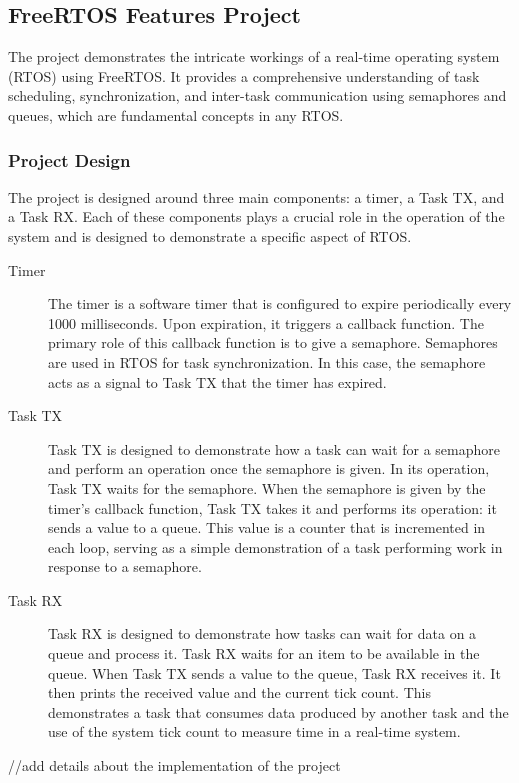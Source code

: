\subsection{FreeRTOS Features Project}

The project demonstrates the intricate workings of a real-time operating system (RTOS) using FreeRTOS. It provides a comprehensive understanding of task scheduling, synchronization, and inter-task communication using semaphores and queues, which are fundamental concepts in any RTOS.

\subsubsection{Project Design}

The project is designed around three main components: a timer, a Task TX, and a Task RX. Each of these components plays a crucial role in the operation of the system and is designed to demonstrate a specific aspect of RTOS.

\begin{description}
\item[Timer] The timer is a software timer that is configured to expire periodically every 1000 milliseconds. Upon expiration, it triggers a callback function. The primary role of this callback function is to give a semaphore. Semaphores are used in RTOS for task synchronization. In this case, the semaphore acts as a signal to Task TX that the timer has expired.
\item[Task TX] Task TX is designed to demonstrate how a task can wait for a semaphore and perform an operation once the semaphore is given. In its operation, Task TX waits for the semaphore. When the semaphore is given by the timer's callback function, Task TX takes it and performs its operation: it sends a value to a queue. This value is a counter that is incremented in each loop, serving as a simple demonstration of a task performing work in response to a semaphore.
\item[Task RX] Task RX is designed to demonstrate how tasks can wait for data on a queue and process it. Task RX waits for an item to be available in the queue. When Task TX sends a value to the queue, Task RX receives it. It then prints the received value and the current tick count. This demonstrates a task that consumes data produced by another task and the use of the system tick count to measure time in a real-time system.
\end{description}

//add details about the implementation of the project